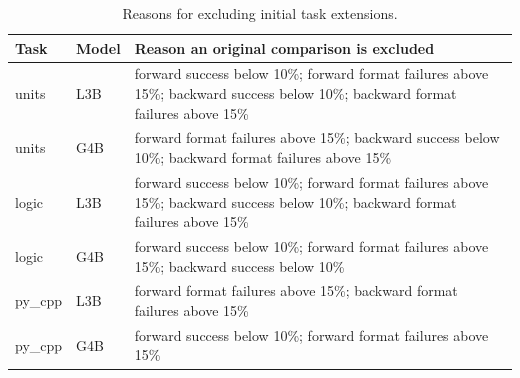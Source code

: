\begin{table}[t]\centering\small
\begin{tabular}{llp{}}\toprule
Task & Model & Reason an original comparison is excluded \\\midrule
units & L3B & forward success below 10\%; forward format failures above 15\%; backward success below 10\%; backward format failures above 15\% \\
units & G4B & forward format failures above 15\%; backward success below 10\%; backward format failures above 15\% \\
logic & L3B & forward success below 10\%; forward format failures above 15\%; backward success below 10\%; backward format failures above 15\% \\
logic & G4B & forward success below 10\%; forward format failures above 15\%; backward success below 10\% \\
py\_cpp & L3B & forward format failures above 15\%; backward format failures above 15\% \\
py\_cpp & G4B & forward success below 10\%; forward format failures above 15\% \\
\bottomrule\end{tabular}
\caption{Reasons for excluding initial task extensions.}\label{tab:initial-failure-reasons}\end{table}
